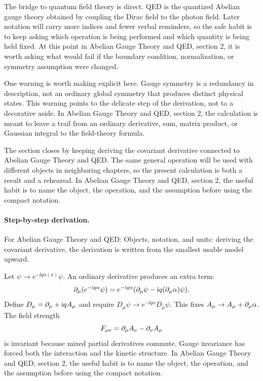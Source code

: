 The bridge to quantum field theory is direct.  QED is the quantized Abelian gauge theory obtained by coupling the Dirac field to the photon field.  Later notation will carry more indices and fewer verbal reminders, so the safe habit is to keep asking which operation is being performed and which quantity is being held fixed.  At this point in Abelian Gauge Theory and QED, section 2, it is worth asking what would fail if the boundary condition, normalization, or symmetry assumption were changed.

One warning is worth making explicit here.  Gauge symmetry is a redundancy in description, not an ordinary global symmetry that produces distinct physical states.  This warning points to the delicate step of the derivation, not to a decorative aside.  In Abelian Gauge Theory and QED, section 2, the calculation is meant to leave a trail from an ordinary derivative, sum, matrix product, or Gaussian integral to the field-theory formula.

The section closes by keeping deriving the covariant derivative connected to Abelian Gauge Theory and QED.  The same general operation will be used with different objects in neighboring chapters, so the present calculation is both a result and a rehearsal.  In Abelian Gauge Theory and QED, section 2, the useful habit is to name the object, the operation, and the assumption before using the compact notation.



\paragraph{Step-by-step derivation.}

For Abelian Gauge Theory and QED: Objects, notation, and units: deriving the covariant derivative, the derivation is written from the smallest usable model upward.

Let \(\psi\to e^{-\ii q\alpha(x)}\psi\).  An ordinary derivative produces an extra term:
\[
  \partial_\mu(e^{-\mathrm i q\alpha}\psi)
  =
  e^{-\mathrm i q\alpha}(\partial_\mu\psi-\mathrm i q(\partial_\mu\alpha)\psi).
\]
Define \(D_\mu=\partial_\mu+\mathrm i qA_\mu\) and require \(D_\mu\psi\to e^{-\ii q\alpha}D_\mu\psi\).  This fixes \(A_\mu\to A_\mu+\partial_\mu\alpha\).  The field strength
\[
  F_{\mu\nu}=\partial_\mu A_\nu-\partial_\nu A_\mu
\]
is invariant because mixed partial derivatives commute.  Gauge invariance has forced both the interaction and the kinetic structure.  In Abelian Gauge Theory and QED, section 2, the useful habit is to name the object, the operation, and the assumption before using the compact notation.


